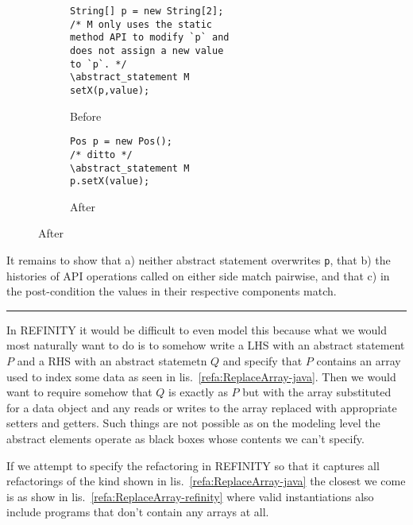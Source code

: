 \begin{figure}
  \begin{subfigure}[h]{.45\linewidth} 
    \begin{lstlisting}[style=smallJava]
String[] p = new String[2];
/* M only uses the static
method API to modify `p` and
does not assign a new value
to `p`. */
\abstract_statement M
setX(p,value);
    \end{lstlisting}
    \caption{Before}
    \label{lst:ArrayBefore}
  \end{subfigure}\hspace{1cm}
  \begin{subfigure}[h]{.45\linewidth}
        \begin{lstlisting}[style=smallJava]
Pos p = new Pos();
/* ditto */
\abstract_statement M
p.setX(value);
    \end{lstlisting}
    \caption{After}
    \label{lst:ArrayAfter}
  \end{subfigure}
  \label{lst:ReplaceArray-REF}
\end{figure}

It remains to show that a) neither abstract statement overwrites \texttt{p}, that b) the histories of API operations called on either side match pairwise,
and that c) in the post-condition the values in their respective components match.


\noindent\rule{\textwidth}{2pt}


In REFINITY it would be difficult to even model this because what we would most naturally want to do is to somehow write a LHS with an abstract statement $P$ and a RHS with an abstract statemetn $Q$ and specify that $P$ contains an array used to index some data as seen in lis.~\ref{refa:ReplaceArray-java}. Then we would want to require somehow that $Q$ is exactly as $P$ but with the array substituted for a data object and any reads or writes to the array replaced with appropriate setters and getters. Such things are not possible as on the modeling level the abstract elements operate as black boxes whose contents we can't specify.

If we attempt to specify the refactoring in REFINITY so that it captures all refactorings of the kind shown in lis.~\ref{refa:ReplaceArray-java} the closest we come is as show in lis.~\ref{refa:ReplaceArray-refinity} where valid instantiations
also include programs that don't contain any arrays at all.

